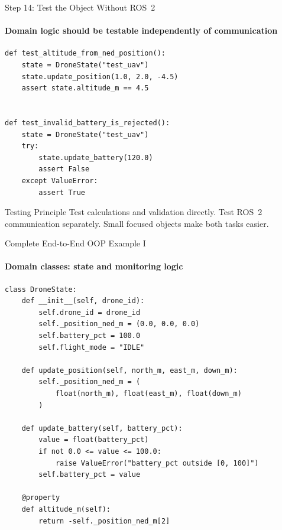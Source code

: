 \begin{frame}[fragile]{Step 14: Test the Object Without ROS~2}
\framesubtitle{Domain logic should be testable independently of communication}

\begin{verbatim}
def test_altitude_from_ned_position():
    state = DroneState("test_uav")
    state.update_position(1.0, 2.0, -4.5)
    assert state.altitude_m == 4.5


def test_invalid_battery_is_rejected():
    state = DroneState("test_uav")
    try:
        state.update_battery(120.0)
        assert False
    except ValueError:
        assert True
\end{verbatim}

\begin{exampleblock}{Testing Principle}
    Test calculations and validation directly. Test ROS~2 communication separately.
    Small focused objects make both tasks easier.
\end{exampleblock}
\end{frame}


\begin{frame}[fragile]{Complete End-to-End OOP Example I}
\framesubtitle{Domain classes: state and monitoring logic}

\scriptsize
\begin{verbatim}
class DroneState:
    def __init__(self, drone_id):
        self.drone_id = drone_id
        self._position_ned_m = (0.0, 0.0, 0.0)
        self.battery_pct = 100.0
        self.flight_mode = "IDLE"

    def update_position(self, north_m, east_m, down_m):
        self._position_ned_m = (
            float(north_m), float(east_m), float(down_m)
        )

    def update_battery(self, battery_pct):
        value = float(battery_pct)
        if not 0.0 <= value <= 100.0:
            raise ValueError("battery_pct outside [0, 100]")
        self.battery_pct = value

    @property
    def altitude_m(self):
        return -self._position_ned_m[2]
\end{verbatim}
\end{frame}


